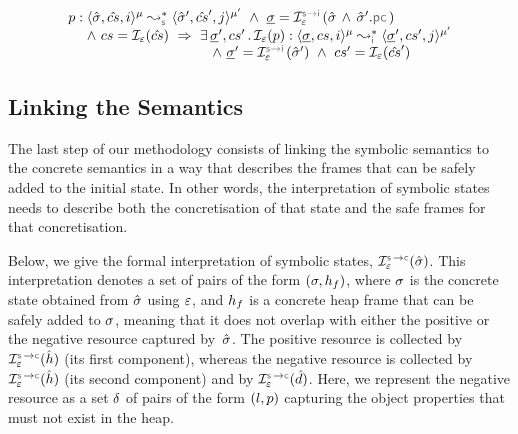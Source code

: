 \begin{theorem}\label{lemma:soundness:jsil:symb:exe:instrumented:instrumented}
\vspace*{-0.1cm}
$$
\begin{array}{l}
\prog : \transabssemrule{\sstate, \scs, i}{\sstate', \scs', j}{\mode}{\mode'}{\symbolic} \ \wedge \ \istate = \interpret{\symbinst}{\senv}(\sstate \, \wedge \, \sstate'.\pcsel) \\ \quad \ \wedge \ \cs = \shorthand(\scs) \ \Rightarrow \ \exists \, \istate', \cs' \, . \, 
        \shorthand(\prog) : \transabssemrule{\istate, \cs, i}{\istate', \cs', j}{\mode}{\mode'}{\instrumented} \\ \quad \quad \quad \quad  \quad \quad \quad \quad  \quad \quad
             \ \wedge \ \istate' = \interpret{\symbinst}{\senv}(\sstate')  \ \wedge \ \cs' = \shorthand(\scs')
\end{array}
$$
\end{theorem}



\vspace*{-0.25cm}
\subsection{Linking the Semantics}\label{sex:formal:guarantees}

The last step of our methodology consists of linking the symbolic semantics to the concrete semantics in a way that describes the frames that can be safely added to the initial state.  
In other words, the interpretation of symbolic states needs to describe both the concretisation of that state and the safe frames for that concretisation. 

Below, we give the formal interpretation of symbolic states, 
$\interpret{\symbconc}{\senv}(\sstate)$. This interpretation denotes a set of pairs of the form $(\sigma, h_f)$,
where $\sigma$ is the concrete state obtained from $\hat{\sigma}$ using $\varepsilon$, and $h_f$ is
a concrete heap frame that can be safely added to $\sigma$, meaning that it does not overlap with either the positive or the negative resource captured by~$\hat{\sigma}$. The positive resource is collected by $\interpret{\symbconc}{\senv}(\sheap)$ (its first component), whereas the negative resource is collected by $\interpret{\symbconc}{\senv}(\sheap)$ (its second component) and by $\interpret{\symbconc}{\senv}(\sdom)$. 
Here, we represent the negative resource as a set $\delta$ of pairs of the form $(l, p)$ capturing the 
object properties that must not exist in the heap.


